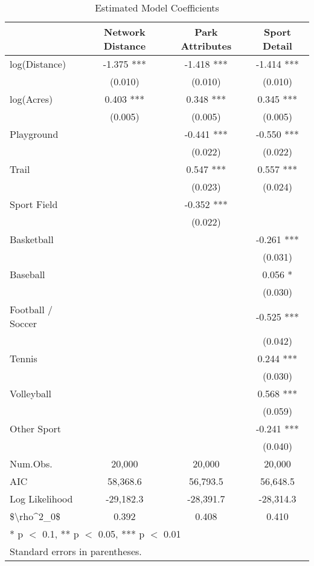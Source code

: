 \documentclass[3p, authoryear, review]{elsarticle} %
\begin{document}
\begin{table}

\caption{\label{tab:base-modelsummary}Estimated Model Coefficients}
\centering
\begin{tabular}[t]{lccc}
\toprule
  & Network Distance & Park Attributes & Sport Detail\\
\midrule
log(Distance) & -1.375 *** & -1.418 *** & -1.414 ***\\
 & (0.010) & (0.010) & (0.010)\\
log(Acres) & 0.403 *** & 0.348 *** & 0.345 ***\\
 & (0.005) & (0.005) & (0.005)\\
Playground &  & -0.441 *** & -0.550 ***\\
 &  & (0.022) & (0.022)\\
Trail &  & 0.547 *** & 0.557 ***\\
 &  & (0.023) & (0.024)\\
Sport Field &  & -0.352 *** & \\
 &  & (0.022) & \\
Basketball &  &  & -0.261 ***\\
 &  &  & (0.031)\\
Baseball &  &  & 0.056 *\\
 &  &  & \vphantom{1} (0.030)\\
Football / Soccer &  &  & -0.525 ***\\
 &  &  & (0.042)\\
Tennis &  &  & 0.244 ***\\
 &  &  & (0.030)\\
Volleyball &  &  & 0.568 ***\\
 &  &  & (0.059)\\
Other Sport &  &  & -0.241 ***\\
 &  &  & (0.040)\\
\midrule
Num.Obs. & 20,000 & 20,000 & 20,000\\
AIC & 58,368.6 & 56,793.5 & 56,648.5\\
Log Likelihood & -29,182.3 & -28,391.7 & -28,314.3\\
\$\textbackslash{}rho\textasciicircum{}2\_0\$ & 0.392 & 0.408 & 0.410\\
\bottomrule
\multicolumn{4}{l}{\textsuperscript{} * p $<$ 0.1, ** p $<$ 0.05, *** p $<$ 0.01}\\
\multicolumn{4}{l}{\textsuperscript{} Standard errors in parentheses.}\\
\end{tabular}
\end{table}
\end{document}
